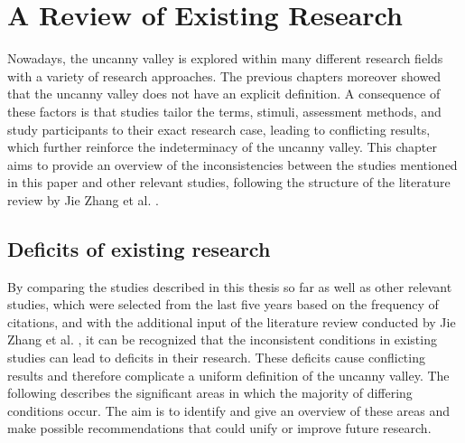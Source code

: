 \chapter{A Review of Existing Research}
\label{chap:5}
Nowadays, the uncanny valley is explored within many different research fields with a variety of research approaches. The previous chapters moreover showed that the uncanny valley does not have an explicit definition. A consequence of these factors is that studies tailor the terms, stimuli, assessment methods, and study participants to their exact research case, leading to conflicting results, which further reinforce the indeterminacy of the uncanny valley.
This chapter aims to provide an overview of the inconsistencies between the studies mentioned in this paper and other relevant studies, following the structure of the literature review by Jie Zhang et al. \cite{quant_review}.

 \section{Deficits of existing research}
 By comparing the studies described in this thesis so far as well as other relevant studies, which were selected from the last five years based on the frequency of citations, and with the additional input of the literature review conducted by Jie Zhang et al. \cite{quant_review}, it can be recognized that the inconsistent conditions in existing studies can lead to deficits in their research. These deficits cause conflicting results and therefore complicate a uniform definition of the uncanny valley. The following describes the significant areas in which the majority of differing conditions occur. The aim is to identify and give an overview of these areas and make possible recommendations that could unify or improve future research. 

